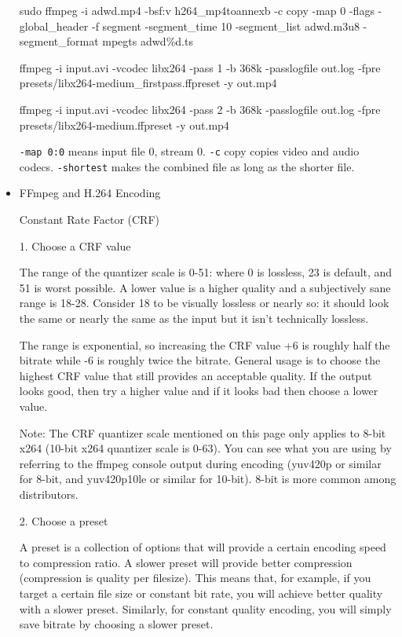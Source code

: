 \begin{itemize}
\begin{bash}
sudo ffmpeg -i adwd.mp4 -bsf:v h264_mp4toannexb -c copy -map 0 -flags -global_header  -f segment -segment_time 10 -segment_list adwd.m3u8 -segment_format mpegts adwd\%d.ts

ffmpeg -i input.avi -vcodec libx264 -pass 1 -b 368k -passlogfile out.log -fpre presets/libx264-medium_firstpass.ffpreset -y out.mp4

ffmpeg -i input.avi -vcodec libx264 -pass 2 -b 368k -passlogfile out.log -fpre presets/libx264-medium.ffpreset -y out.mp4
\end{bash}

\lstinline[columns=fixed]{-map 0:0} means input file 0, stream 0. \lstinline[columns=fixed]{-c} copy copies video and audio codecs. \lstinline[columns=fixed]{-shortest} makes the combined file as long as the shorter file.

\item FFmpeg and H.264 Encoding

Constant Rate Factor (CRF)

1. Choose a CRF value

The range of the quantizer scale is 0-51: where 0 is lossless, 23 is default, and 51 is worst possible. A lower value is a higher quality and a subjectively sane range is 18-28. Consider 18 to be visually lossless or nearly so: it should look the same or nearly the same as the input but it isn't technically lossless.

The range is exponential, so increasing the CRF value +6 is roughly half the bitrate while -6 is roughly twice the bitrate. General usage is to choose the highest CRF value that still provides an acceptable quality. If the output looks good, then try a higher value and if it looks bad then choose a lower value.

Note: The CRF quantizer scale mentioned on this page only applies to 8-bit x264 (10-bit x264 quantizer scale is 0-63). You can see what you are using by referring to the ffmpeg console output during encoding (yuv420p or similar for 8-bit, and yuv420p10le or similar for 10-bit). 8-bit is more common among distributors.

2. Choose a preset

A preset is a collection of options that will provide a certain encoding speed to compression ratio. A slower preset will provide better compression (compression is quality per filesize). This means that, for example, if you target a certain file size or constant bit rate, you will achieve better quality with a slower preset. Similarly, for constant quality encoding, you will simply save bitrate by choosing a slower preset.


\end{itemize}
